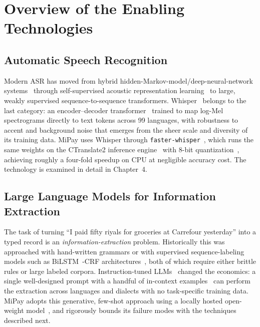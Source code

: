 \section{Overview of the Enabling Technologies}

\subsection{Automatic Speech Recognition}

Modern ASR has moved from hybrid hidden-Markov-model/deep-neural-network
systems~\cite{hinton2012deep,povey2011kaldi} through self-supervised acoustic
representation learning~\cite{baevski2020wav2vec} to large, weakly supervised
sequence-to-sequence transformers. Whisper~\cite{radford2023whisper} belongs to
the last category: an encoder--decoder transformer~\cite{vaswani2017attention}
trained to map log-Mel spectrograms directly to text tokens across 99 languages,
with robustness to accent and background noise that emerges from the sheer scale
and diversity of its training data. MiPay uses Whisper through
\texttt{faster-whisper}~\cite{fasterwhisper}, which runs the same weights on the
CTranslate2 inference engine~\cite{ctranslate2} with 8-bit
quantization~\cite{dettmers2022llmint8}, achieving roughly a four-fold speedup on
CPU at negligible accuracy cost. The technology is examined in detail in
Chapter~4.

\subsection{Large Language Models for Information Extraction}

The task of turning ``I paid fifty riyals for groceries at Carrefour yesterday''
into a typed record is an \emph{information-extraction} problem. Historically this
was approached with hand-written grammars or with supervised sequence-labeling
models such as BiLSTM~\cite{hochreiter1997lstm}-CRF architectures~\cite{lample2016ner,li2022ner},
both of which require either brittle rules or large labeled corpora. Instruction-tuned
LLMs~\cite{wei2022flan,ouyang2022instructgpt} changed the economics: a single
well-designed prompt with a handful of in-context
examples~\cite{brown2020gpt3} can perform the extraction across languages and
dialects with no task-specific training data. MiPay adopts this generative,
few-shot approach using a locally hosted open-weight
model~\cite{qwen2024qwen25}, and rigorously bounds its failure modes with the
techniques described next.

